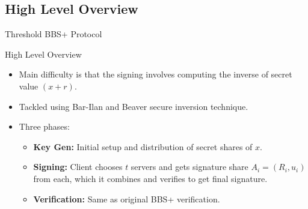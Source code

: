 \documentclass[
	xcolor={svgnames},
	hyperref={pagebackref,bookmarks},
	aspectratio=43,
]{beamer}
\begin{document}
\subsection{High Level Overview}
\begin{frame}{Threshold BBS+ Protocol}
	\begin{block}{High Level Overview}
		\begin{itemize}
			\item Main difficulty is that the signing involves computing the inverse of secret value $(x + r)$.
			\item Tackled using Bar-Ilan and Beaver secure inversion technique.\footnotemark
			\item Three phases:
			\begin{itemize}
				\item \textbf{Key Gen:} Initial setup and distribution of secret shares of $x$.
				\item \textbf{Signing:} Client chooses $t$ servers and gets signature share $A_i = (R_i, u_i)$ from each, which it combines and verifies to get final signature.
				\item \textbf{Verification:} Same as original BBS+ verification.
			\end{itemize}
		\end{itemize}
	\end{block}
\end{frame}
\end{document}
